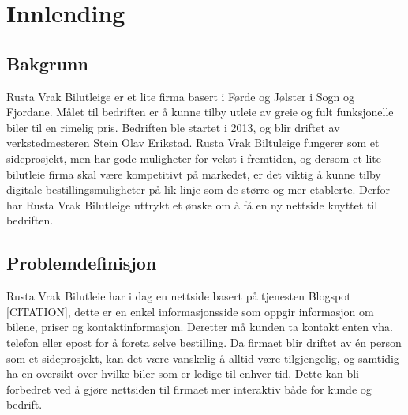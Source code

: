 \chapter{Innlending}
\section{Bakgrunn}



Rusta Vrak Bilutleige er et lite firma basert i Førde og Jølster i Sogn og Fjordane. Målet til bedriften er å kunne tilby utleie av greie og fult funksjonelle biler til en rimelig pris. Bedriften ble startet i 2013, og blir driftet av verkstedmesteren Stein Olav Erikstad. Rusta Vrak Biltuleige fungerer som et sideprosjekt, men har gode muligheter for vekst i fremtiden, og dersom et lite bilutleie firma skal være kompetitivt på markedet, er det viktig å kunne tilby digitale bestillingsmuligheter på lik linje som de større og mer etablerte. Derfor har Rusta Vrak Bilutleige uttrykt et ønske om å få en ny nettside knyttet til bedriften.


\section{Problemdefinisjon}
Rusta Vrak Bilutleie har i dag en nettside basert på tjenesten Blogspot [CITATION], dette er en enkel informasjonsside som oppgir informasjon om bilene, priser og kontaktinformasjon. Deretter må kunden ta kontakt enten vha. telefon eller epost for å foreta selve bestilling. Da firmaet blir driftet av én person som et sideprosjekt, kan det være vanskelig å alltid være tilgjengelig, og samtidig ha en oversikt over hvilke biler som er ledige til enhver tid. Dette kan bli forbedret ved å gjøre nettsiden til firmaet mer interaktiv både for kunde og bedrift. 

